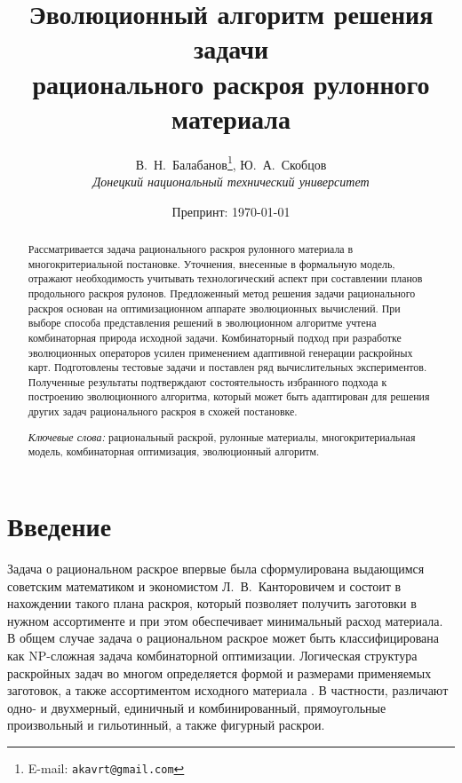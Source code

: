 \documentclass[12pt]{article}
\title{Эволюционный алгоритм решения задачи \\
рационального раскроя рулонного материала}
\author{В.~Н.~Балабанов\thanks{E-mail: \texttt{akavrt@gmail.com}}, 
Ю.~А.~Скобцов \\ [1.0ex]
\normalsize\textit{Донецкий национальный технический университет}
}
\date{Препринт: \today}
\begin{document}
\maketitle

\begin{abstract}
Рассматривается задача рационального раскроя рулонного материала в 
многокритериальной постановке. Уточнения, внесенные в формальную модель, 
отражают необходимость учитывать технологический аспект при составлении планов 
продольного раскроя рулонов. Предложенный метод решения задачи рационального 
раскроя основан на оптимизационном аппарате эволюционных вычислений. При выборе 
способа представления решений в эволюционном алгоритме учтена комбинаторная 
природа исходной задачи. Комбинаторный подход при разработке эволюционных 
операторов усилен применением адаптивной генерации раскройных карт. 
Подготовлены тестовые задачи и поставлен ряд вычислительных экспериментов. 
Полученные результаты подтверждают состоятельность избранного подхода к 
построению эволюционного алгоритма, который может быть адаптирован для решения 
других задач рационального раскроя в схожей постановке.
\smallskip

\noindent\textit{Ключевые слова:} рациональный раскрой, 
рулонные материалы, многокритериальная модель, комбинаторная оптимизация, 
эволюционный алгоритм.
\end{abstract}    

\section{Введение}

Задача о рациональном раскрое впервые была сформулирована выдающимся советским 
математиком и экономистом Л.~В.~Канторовичем 
\cite{kantorovich39} 
и состоит в нахождении такого плана раскроя, который позволяет получить 
заготовки в нужном ассортименте и при этом обеспечивает минимальный расход 
материала. В общем случае задача о рациональном раскрое может быть 
классифицирована как NP-сложная задача комбинаторной оптимизации. 
Логическая структура раскройных задач во многом определяется формой и размерами 
применяемых заготовок, а также ассортиментом исходного материала 
\cite{wascher07}. 
В частности, различают одно- и двухмерный, единичный и комбинированный, 
прямоугольные произвольный и гильотинный, а также фигурный раскрои.
\end{document}
